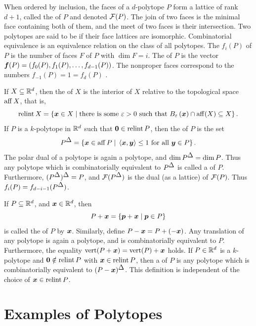 When ordered by inclusion, the faces of a \(d\)-polytope \(P\) form a lattice of rank \(d+1\), called the  of \(P\) and denoted \(\mathcal{F}(P)\).  The join of two faces is the minimal face containing both of them, and the meet of two faces is their intersection.  Two polytopes are said to be  if their face lattices are isomorphic.  Combinatorial equivalence is an equivalence relation on the class of all polytopes.  The  \(f_i(P)\) of \(P\) is the number of faces \(F\) of \(P\) with \(\dim F=i\).  The  of \(P\) is the vector \(\bm{f}(P)=(f_0(P), f_1(P),\dotsc, f_{d-1}(P))\).  The nonproper faces correspond to the numbers \(f_{-1}(P)=1=f_d(P)\) .

If \(X\subseteq\mathbb{R}^{d}\), then the  of \(X\) is the interior of \(X\) relative to the topological space \(\operatorname{aff} X\), that is,
    \[
        \relint X
            =
            \setb{\ve x\in X}
                 {\text{there is some }\eps>0\text{ such that }\B\eps{\ve x}\cap\aff(X)\sbset X}.
    \]
If \(P\) is a \(k\)-polytope in \(\mathbb{R}^{d}\) such that \(\bm{0}\in\operatorname{relint} P\), then the  of \(P\) is the set
    \[
        P^{\tri}
            =   \setb{\ve x\in\aff P}{\ip{\ve x}{\ve y}\le1\text{ for all }\ve y\in P}.
    \]
The polar dual of a polytope is again a polytope, and \(\dim P^{\tri}=\dim P\).  Thus any polytope which is combinatorially equivalent to \(P^{\tri}\) is called a  of \(P\).  Furthermore, \((P^{\tri})^{\tri}=P\), and \(\fl{P^{\tri}}\) is the dual (as a lattice) of \(\mathcal{F}(P)\).  Thus \(f_i(P)=f_{d-i-1}(P^{\tri})\).

If \(P\subseteq\mathbb{R}^{d}\), and \(\bm{x}\in\mathbb{R}^{d}\), then
    \[
        P+\ve x
            =
            \setb{\ve p+\ve x}{\ve p\in P}
    \]
is called the  of \(P\) by \(\bm{x}\).  Similarly, define \(P-\bm{x}=P+(-\bm{x})\).  Any translation of any polytope is again a polytope, and is combinatorially equivalent to \(P\).  Furthermore, the equality \(\operatorname{vert}(P+\bm{x})=\operatorname{vert}(P)+\bm{x}\) holds.  If \(P\in\mathbb{R}^{d}\) is a \(k\)-polytope and \(\bm{0}\notin\operatorname{relint} P\) with \(\bm{x}\in\operatorname{relint} P\), then a  of \(P\) is any polytope which is combinatorially equivalent to \((P-\ve x)^{\tri}\).  This definition is independent of the choice of \(\bm{x}\in\operatorname{relint} P\).

\section{Examples of Polytopes}

